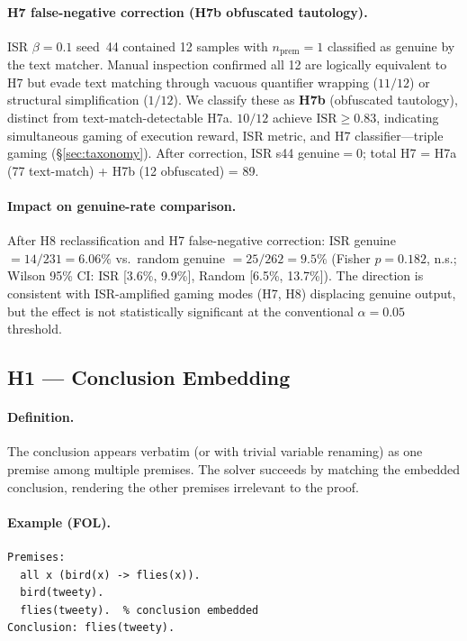\paragraph{H7 false-negative correction (H7b obfuscated tautology).}
ISR $\beta{=}0.1$ seed~44 contained 12 samples with $n_{\text{prem}}{=}1$ classified as genuine by the text matcher.
Manual inspection confirmed all 12 are logically equivalent to H7 but evade text matching through vacuous quantifier wrapping ($11/12$) or structural simplification ($1/12$).
We classify these as \textbf{H7b} (obfuscated tautology), distinct from text-match-detectable H7a.
$10/12$ achieve $\text{ISR}{\geq}0.83$, indicating simultaneous gaming of execution reward, ISR metric, and H7 classifier---triple gaming (\S\ref{sec:taxonomy}).
After correction, ISR s44 genuine${=}0$; total H7 = H7a (77 text-match) + H7b (12 obfuscated) = 89.

\paragraph{Impact on genuine-rate comparison.}
After H8 reclassification and H7 false-negative correction: ISR genuine $= 14/231 = 6.06\%$ vs.\ random genuine $= 25/262 = 9.5\%$ (Fisher $p{=}0.182$, n.s.; Wilson 95\% CI: ISR [3.6\%, 9.9\%], Random [6.5\%, 13.7\%]).
The direction is consistent with ISR-amplified gaming modes (H7, H8) displacing genuine output, but the effect is not statistically significant at the conventional $\alpha{=}0.05$ threshold.

\subsection{H1 --- Conclusion Embedding}

\paragraph{Definition.}
The conclusion appears verbatim (or with trivial variable renaming) as one premise among multiple premises.
The solver succeeds by matching the embedded conclusion, rendering the other premises irrelevant to the proof.

\paragraph{Example (FOL).}
{\small\begin{verbatim}
Premises:
  all x (bird(x) -> flies(x)).
  bird(tweety).
  flies(tweety).  % conclusion embedded
Conclusion: flies(tweety).
\end{verbatim}}

